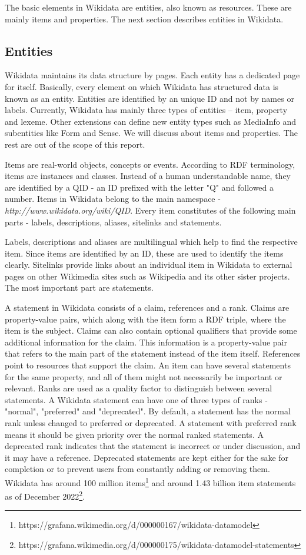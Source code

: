 The basic elements in Wikidata are entities, also known as resources. These are mainly items and properties. The next section describes entities in Wikidata. 

\subsection{Entities}
Wikidata maintains its data structure by pages. Each entity has a dedicated page for itself. Basically, every element on which Wikidata has structured data is known as an entity\cite{Erxleben2014}. Entities are identified by an unique ID and not by names or labels. Currently, Wikidata has mainly three types of entities – item, property and lexeme. Other extensions can define new entity types such as MediaInfo and subentities like Form and Sense. We will discuss about items and properties. The rest are out of the scope of this report.

Items are real-world objects, concepts or events. According to RDF terminology, items are instances and classes. Instead of a human understandable name, they are identified by a QID - an ID prefixed with the letter "Q" and followed a number. Items in Wikidata belong to the main namespace - \textit{http://www.wikidata.org/wiki/QID}. Every item constitutes of the following main parts - labels, descriptions, aliases, sitelinks and statements\cite{Erxleben2014}.

Labels, descriptions and aliases are multilingual which help to find the respective item. Since items are identified by an ID, these are used to identify the items clearly. Sitelinks provide links about an individual item in Wikidata to external pages on other Wikimedia sites such as Wikipedia and its other sister projects. The most important part are statements. 

A statement in Wikidata consists of a claim, references and a rank. Claims are property-value pairs, which along with the item form a RDF triple, where the item is the subject. Claims can also contain optional qualifiers that provide some additional information for the claim. This information is a property-value pair that refers to the main part of the statement instead of the item itself\cite{Erxleben2014}. References point to resources that support the claim. An item can have several statements for the same property, and all of them might not necessarily be important or relevant. Ranks are used as a quality factor to distinguish between several statements. A Wikidata statement can have one of three types of ranks - "normal", "preferred" and "deprecated". By default, a statement has the normal rank unless changed to preferred or deprecated. A statement with preferred rank means it should be given priority over the normal ranked statements. A deprecated rank indicates that the statement is incorrect or under discussion, and it may have a reference. Deprecated statements are kept either for the sake for completion or to prevent users from constantly adding or removing them. Wikidata has around 100 million items\footnote{https://grafana.wikimedia.org/d/000000167/wikidata-datamodel} and around 1.43 billion item statements as of December 2022\footnote{https://grafana.wikimedia.org/d/000000175/wikidata-datamodel-statements}.

